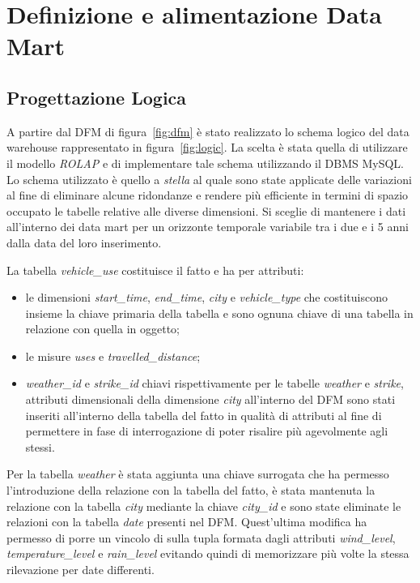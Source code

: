 \chapter{Definizione e alimentazione Data Mart}

\section{Progettazione Logica}

A partire dal DFM di figura~\ref{fig:dfm} è stato realizzato lo schema
logico del data warehouse rappresentato in figura~\ref{fig:logic}.
La scelta è stata quella di utilizzare il modello \textit{ROLAP} e di
implementare tale schema utilizzando il DBMS MySQL.
Lo schema utilizzato è quello a \textit{stella} al quale sono state applicate
delle variazioni al fine di eliminare alcune ridondanze e rendere più efficiente
in termini di spazio occupato le tabelle relative alle diverse dimensioni.
Si sceglie di mantenere i dati all'interno dei data mart per un orizzonte
temporale variabile tra i due e i 5 anni dalla data del loro inserimento.

La tabella \textit{vehicle\_use} costituisce il fatto e ha per attributi:
\begin{itemize}
\item le dimensioni \textit{start\_time}, \textit{end\_time}, \textit{city} e
\textit{vehicle\_type} che costituiscono insieme la chiave primaria della
tabella e sono ognuna chiave di una tabella in relazione con quella in oggetto;
\item le misure \textit{uses} e \textit{travelled\_distance};
\item \textit{weather\_id} e \textit{strike\_id} chiavi rispettivamente per
le tabelle \textit{weather} e \textit{strike}, attributi dimensionali della
dimensione \textit{city} all'interno del DFM sono stati inseriti all'interno
della tabella del fatto in qualità di attributi al fine di permettere in
fase di interrogazione di poter risalire più agevolmente agli stessi.
\end{itemize}

Per la tabella \textit{weather} è stata aggiunta una chiave surrogata che ha
permesso l'introduzione della relazione con la tabella del fatto, è stata
mantenuta la relazione con la tabella \textit{city} mediante la chiave
\textit{city\_id} e sono state eliminate le relazioni con la tabella
\textit{date} presenti nel DFM. Quest'ultima modifica ha permesso di
porre un vincolo di  sulla tupla formata dagli attributi
\textit{wind\_level}, \textit{temperature\_level} e \textit{rain\_level}
evitando quindi di memorizzare più volte la stessa rilevazione per date
differenti.

